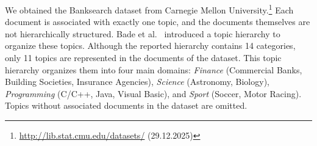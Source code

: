 We obtained the Banksearch dataset from Carnegie Mellon University.\footnote{\url{http://lib.stat.cmu.edu/datasets/} (29.12.2025)}
Each document is associated with exactly one topic, and the documents themselves are not hierarchically structured.
Bade et al.~\cite{bade_creating_2008} introduced a topic hierarchy to organize these topics.
Although the reported hierarchy contains 14 categories, only 11 topics are represented in the documents of the dataset.
This topic hierarchy organizes them into four main domains: \textit{Finance} (Commercial Banks, Building Societies, Insurance Agencies), \textit{Science} (Astronomy, Biology), \textit{Programming} (C/C++, Java, Visual Basic), and \textit{Sport} (Soccer, Motor Racing). Topics without associated documents in the dataset are omitted. 




